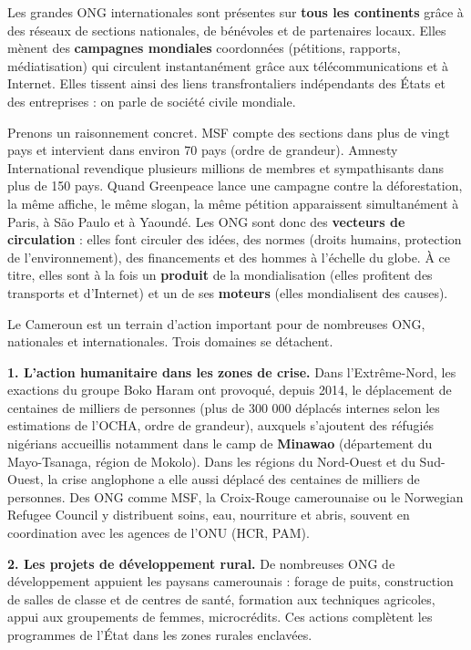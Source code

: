 \documentclass[11pt]{article}
\newcommand{\cle}[1]{{\popxbold\color{popdark}#1}}
\newcounter{popsec}
\newcounter{popsub}
\newcommand{\courssub}[1]{%
  \stepcounter{popsub}%
  \par\vspace{9pt}\noindent{\popxbold\fontsize{11.5}{13}\selectfont\color{popink}{\color{poporange}\thepopsec.\thepopsub}\hspace{6pt}#1}\par\nopagebreak\vspace{4pt}
}
\begin{document}
\begin{propriete}
Les grandes ONG internationales sont présentes sur \textbf{tous les continents} grâce à des réseaux de sections nationales, de bénévoles et de partenaires locaux. Elles mènent des \textbf{campagnes mondiales} coordonnées (pétitions, rapports, médiatisation) qui circulent instantanément grâce aux télécommunications et à Internet. Elles tissent ainsi des liens transfrontaliers indépendants des États et des entreprises : on parle de \cle{société civile mondiale}.
\end{propriete}

Prenons un raisonnement concret. MSF compte des sections dans plus de vingt pays et intervient dans environ 70 pays (ordre de grandeur). Amnesty International revendique plusieurs millions de membres et sympathisants dans plus de 150 pays. Quand Greenpeace lance une campagne contre la déforestation, la même affiche, le même slogan, la même pétition apparaissent simultanément à Paris, à São Paulo et à Yaoundé. Les ONG sont donc des \textbf{vecteurs de circulation} : elles font circuler des idées, des normes (droits humains, protection de l'environnement), des financements et des hommes à l'échelle du globe. À ce titre, elles sont à la fois un \textbf{produit} de la mondialisation (elles profitent des transports et d'Internet) et un de ses \textbf{moteurs} (elles mondialisent des causes).

\courssub{Le rôle des ONG au Cameroun}

Le Cameroun est un terrain d'action important pour de nombreuses ONG, nationales et internationales. Trois domaines se détachent.

\textbf{1. L'action humanitaire dans les zones de crise.} Dans l'Extrême-Nord, les exactions du groupe Boko Haram ont provoqué, depuis 2014, le déplacement de centaines de milliers de personnes (plus de 300 000 déplacés internes selon les estimations de l'OCHA, ordre de grandeur), auxquels s'ajoutent des réfugiés nigérians accueillis notamment dans le camp de \textbf{Minawao} (département du Mayo-Tsanaga, région de Mokolo). Dans les régions du Nord-Ouest et du Sud-Ouest, la crise anglophone a elle aussi déplacé des centaines de milliers de personnes. Des ONG comme MSF, la Croix-Rouge camerounaise ou le Norwegian Refugee Council y distribuent soins, eau, nourriture et abris, souvent en coordination avec les agences de l'ONU (HCR, PAM).

\textbf{2. Les projets de développement rural.} De nombreuses ONG de développement appuient les paysans camerounais : forage de puits, construction de salles de classe et de centres de santé, formation aux techniques agricoles, appui aux groupements de femmes, microcrédits. Ces actions complètent les programmes de l'État dans les zones rurales enclavées.
\end{document}
